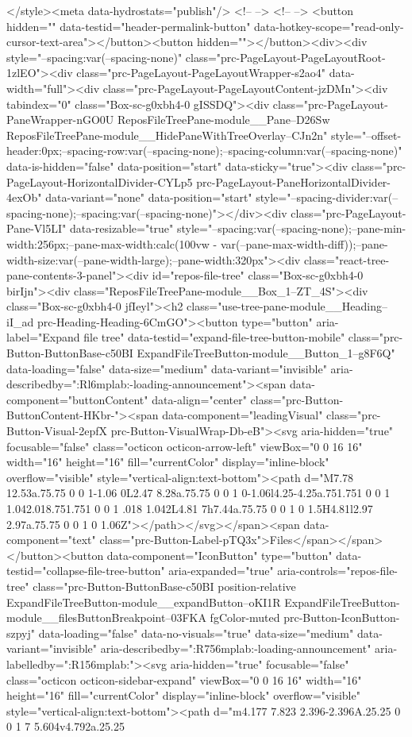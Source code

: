 {{{{{{{{{{{{{{{{{{{{{{{{{{{{{</style><meta data-hydrostats="publish"/> <!-- --> <!-- --> <button hidden="" data-testid="header-permalink-button" data-hotkey-scope="read-only-cursor-text-area"></button><button hidden=""></button><div><div style="--spacing:var(--spacing-none)" class="prc-PageLayout-PageLayoutRoot-1zlEO"><div class="prc-PageLayout-PageLayoutWrapper-s2ao4" data-width="full"><div class="prc-PageLayout-PageLayoutContent-jzDMn"><div tabindex="0" class="Box-sc-g0xbh4-0 gISSDQ"><div class="prc-PageLayout-PaneWrapper-nGO0U ReposFileTreePane-module__Pane--D26Sw ReposFileTreePane-module__HidePaneWithTreeOverlay--CJn2n" style="--offset-header:0px;--spacing-row:var(--spacing-none);--spacing-column:var(--spacing-none)" data-is-hidden="false" data-position="start" data-sticky="true"><div class="prc-PageLayout-HorizontalDivider-CYLp5 prc-PageLayout-PaneHorizontalDivider-4exOb" data-variant="none" data-position="start" style="--spacing-divider:var(--spacing-none);--spacing:var(--spacing-none)"></div><div class="prc-PageLayout-Pane-Vl5LI" data-resizable="true" style="--spacing:var(--spacing-none);--pane-min-width:256px;--pane-max-width:calc(100vw - var(--pane-max-width-diff));--pane-width-size:var(--pane-width-large);--pane-width:320px"><div class="react-tree-pane-contents-3-panel"><div id="repos-file-tree" class="Box-sc-g0xbh4-0 birIjn"><div class="ReposFileTreePane-module__Box_1--ZT_4S"><div class="Box-sc-g0xbh4-0 jfIeyl"><h2 class="use-tree-pane-module__Heading--iI_ad prc-Heading-Heading-6CmGO"><button type="button" aria-label="Expand file tree" data-testid="expand-file-tree-button-mobile" class="prc-Button-ButtonBase-c50BI ExpandFileTreeButton-module__Button_1--g8F6Q" data-loading="false" data-size="medium" data-variant="invisible" aria-describedby=":Rl6mplab:-loading-announcement"><span data-component="buttonContent" data-align="center" class="prc-Button-ButtonContent-HKbr-"><span data-component="leadingVisual" class="prc-Button-Visual-2epfX prc-Button-VisualWrap-Db-eB"><svg aria-hidden="true" focusable="false" class="octicon octicon-arrow-left" viewBox="0 0 16 16" width="16" height="16" fill="currentColor" display="inline-block" overflow="visible" style="vertical-align:text-bottom"><path d="M7.78 12.53a.75.75 0 0 1-1.06 0L2.47 8.28a.75.75 0 0 1 0-1.06l4.25-4.25a.751.751 0 0 1 1.042.018.751.751 0 0 1 .018 1.042L4.81 7h7.44a.75.75 0 0 1 0 1.5H4.81l2.97 2.97a.75.75 0 0 1 0 1.06Z"></path></svg></span><span data-component="text" class="prc-Button-Label-pTQ3x">Files</span></span></button><button data-component="IconButton" type="button" data-testid="collapse-file-tree-button" aria-expanded="true" aria-controls="repos-file-tree" class="prc-Button-ButtonBase-c50BI position-relative ExpandFileTreeButton-module__expandButton--oKI1R ExpandFileTreeButton-module__filesButtonBreakpoint--03FKA fgColor-muted prc-Button-IconButton-szpyj" data-loading="false" data-no-visuals="true" data-size="medium" data-variant="invisible" aria-describedby=":R756mplab:-loading-announcement" aria-labelledby=":R156mplab:"><svg aria-hidden="true" focusable="false" class="octicon octicon-sidebar-expand" viewBox="0 0 16 16" width="16" height="16" fill="currentColor" display="inline-block" overflow="visible" style="vertical-align:text-bottom"><path d="m4.177 7.823 2.396-2.396A.25.25 0 0 1 7 5.604v4.792a.25.25 }}}}}}}}}}}}}}}}}}}}}}}}}}}}}
